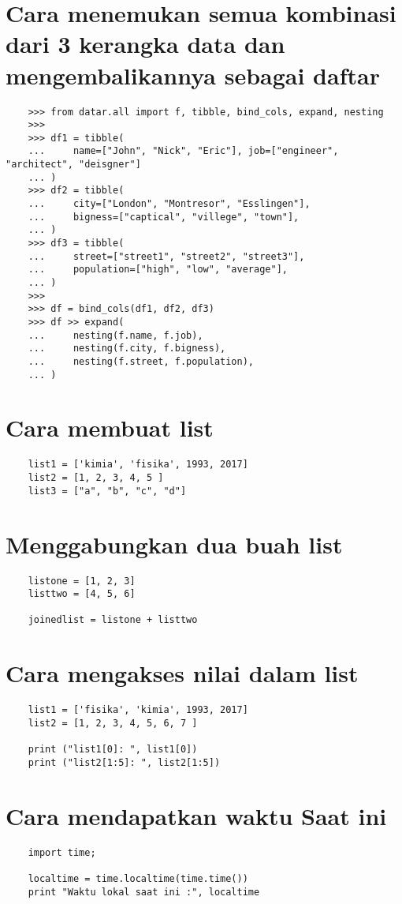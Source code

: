 \documentclass[12pt]{article} %
\begin{document}
\section{Cara menemukan semua kombinasi dari 3 kerangka data dan mengembalikannya sebagai daftar}
\begin{lstlisting}
	>>> from datar.all import f, tibble, bind_cols, expand, nesting
	>>> 
	>>> df1 = tibble(
	...     name=["John", "Nick", "Eric"], job=["engineer", "architect", "deisgner"]
	... )
	>>> df2 = tibble(
	...     city=["London", "Montresor", "Esslingen"],
	...     bigness=["captical", "villege", "town"],
	... )
	>>> df3 = tibble(
	...     street=["street1", "street2", "street3"],
	...     population=["high", "low", "average"],
	... )
	>>> 
	>>> df = bind_cols(df1, df2, df3)
	>>> df >> expand(
	...     nesting(f.name, f.job),
	...     nesting(f.city, f.bigness),
	...     nesting(f.street, f.population),
	... )
\end{lstlisting}

\section {Cara membuat list}
\begin {lstlisting}
	list1 = ['kimia', 'fisika', 1993, 2017]
	list2 = [1, 2, 3, 4, 5 ]
	list3 = ["a", "b", "c", "d"]
\end {lstlisting}

\section {Menggabungkan dua buah list}
\begin{lstlisting}
	listone = [1, 2, 3]
	listtwo = [4, 5, 6]
		
	joinedlist = listone + listtwo
\end{lstlisting}

\section {Cara mengakses nilai dalam list}
\begin{lstlisting}
	list1 = ['fisika', 'kimia', 1993, 2017]
	list2 = [1, 2, 3, 4, 5, 6, 7 ]
	
	print ("list1[0]: ", list1[0])
	print ("list2[1:5]: ", list2[1:5])
\end{lstlisting}

\section{Cara mendapatkan waktu Saat ini}
\begin {lstlisting}
	import time;
	
	localtime = time.localtime(time.time())
	print "Waktu lokal saat ini :", localtime
\end{lstlisting}
\end{document}
